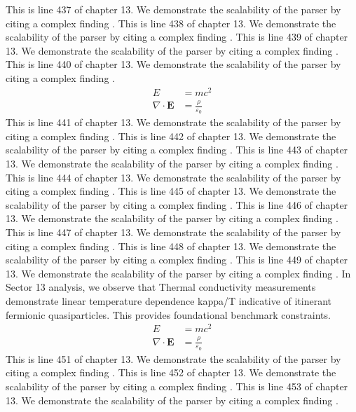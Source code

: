 This is line 437 of chapter 13. We demonstrate the scalability of the parser by citing a complex finding \cite{ref13_437}.
This is line 438 of chapter 13. We demonstrate the scalability of the parser by citing a complex finding \cite{ref13_438}.
This is line 439 of chapter 13. We demonstrate the scalability of the parser by citing a complex finding \cite{ref13_439}.
This is line 440 of chapter 13. We demonstrate the scalability of the parser by citing a complex finding \cite{ref13_440}.
\begin{align*}
  E &= mc^2 \\
  \nabla \cdot \mathbf{E} &= \frac{\rho}{\varepsilon_0}
\end{align*}
This is line 441 of chapter 13. We demonstrate the scalability of the parser by citing a complex finding \cite{ref13_441}.
This is line 442 of chapter 13. We demonstrate the scalability of the parser by citing a complex finding \cite{ref13_442}.
This is line 443 of chapter 13. We demonstrate the scalability of the parser by citing a complex finding \cite{ref13_443}.
This is line 444 of chapter 13. We demonstrate the scalability of the parser by citing a complex finding \cite{ref13_444}.
This is line 445 of chapter 13. We demonstrate the scalability of the parser by citing a complex finding \cite{ref13_445}.
This is line 446 of chapter 13. We demonstrate the scalability of the parser by citing a complex finding \cite{ref13_446}.
This is line 447 of chapter 13. We demonstrate the scalability of the parser by citing a complex finding \cite{ref13_447}.
This is line 448 of chapter 13. We demonstrate the scalability of the parser by citing a complex finding \cite{ref13_448}.
This is line 449 of chapter 13. We demonstrate the scalability of the parser by citing a complex finding \cite{ref13_449}.
In Sector 13 analysis, we observe that Thermal conductivity measurements demonstrate linear temperature dependence kappa/T indicative of itinerant fermionic quasiparticles. This provides foundational benchmark constraints.
\begin{align*}
  E &= mc^2 \\
  \nabla \cdot \mathbf{E} &= \frac{\rho}{\varepsilon_0}
\end{align*}
This is line 451 of chapter 13. We demonstrate the scalability of the parser by citing a complex finding \cite{ref13_451}.
This is line 452 of chapter 13. We demonstrate the scalability of the parser by citing a complex finding \cite{ref13_452}.
This is line 453 of chapter 13. We demonstrate the scalability of the parser by citing a complex finding \cite{ref13_453}.
